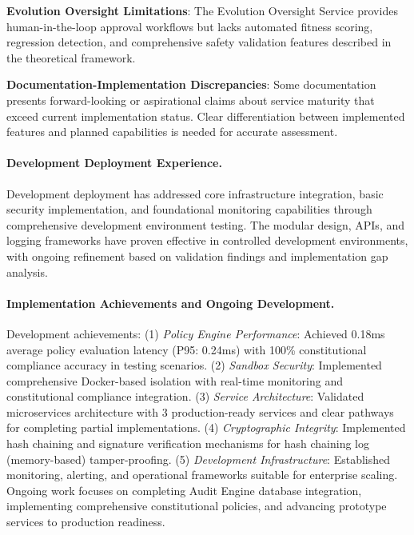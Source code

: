 \documentclass[manuscript,screen,9pt]{acmart}
\begin{document}
\noindent\textbf{Evolution Oversight Limitations}: The Evolution Oversight Service provides human-in-the-loop approval workflows but lacks automated fitness scoring, regression detection, and comprehensive safety validation features described in the theoretical framework.

\noindent\textbf{Documentation-Implementation Discrepancies}: Some documentation presents forward-looking or aspirational claims about service maturity that exceed current implementation status. Clear differentiation between implemented features and planned capabilities is needed for accurate assessment.

\paragraph{Development Deployment Experience.} Development deployment has addressed core infrastructure integration, basic security implementation, and foundational monitoring capabilities through comprehensive development environment testing. The modular design, APIs, and logging frameworks have proven effective in controlled development environments, with ongoing refinement based on validation findings and implementation gap analysis.

\paragraph{Implementation Achievements and Ongoing Development.}
Development achievements: (1) \textit{Policy Engine Performance}: Achieved 0.18ms average policy evaluation latency (P95: 0.24ms) with 100\% constitutional compliance accuracy in testing scenarios. (2) \textit{Sandbox Security}: Implemented comprehensive Docker-based isolation with real-time monitoring and constitutional compliance integration. (3) \textit{Service Architecture}: Validated microservices architecture with 3 production-ready services and clear pathways for completing partial implementations. (4) \textit{Cryptographic Integrity}: Implemented hash chaining and signature verification mechanisms for hash chaining log (memory-based) tamper-proofing. (5) \textit{Development Infrastructure}: Established monitoring, alerting, and operational frameworks suitable for enterprise scaling. Ongoing work focuses on completing Audit Engine database integration, implementing comprehensive constitutional policies, and advancing prototype services to production readiness.
\end{document}
